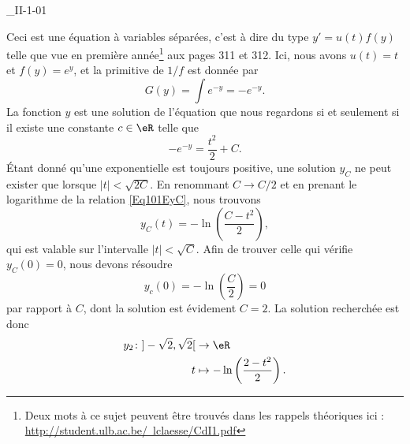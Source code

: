 

\begin{corrige}{_II-1-01}

Ceci est une équation à variables séparées, c'est à dire du type $y'=u(t)f(y)$ telle que vue en première année\footnote{Deux mots à ce sujet peuvent être trouvés dans les rappels théoriques ici :\\\href{http://student.ulb.ac.be/~lclaesse/CdI1.pdf}{http://student.ulb.ac.be/~lclaesse/CdI1.pdf}} aux pages 311 et 312. Ici, nous avons $u(t)=t$ et $f(y)= e^{y}$, et la primitive de $1/f$ est donnée par
\begin{equation}
	G(y)=\int e^{-y}=- e^{-y}.
\end{equation}
La fonction $y$ est une solution de l'équation que nous regardons si et seulement si il existe une constante $c\in\eR$ telle que
\begin{equation}		\label{Eq101EyC}
	- e^{-y}=\frac{ t^2 }{ 2 }+C.
\end{equation}
Étant donné qu'une exponentielle est toujours positive, une solution $y_C$ ne peut exister que lorsque $| t |<\sqrt{2C}$. En renommant $C\to C/2$ et en prenant le logarithme de la relation \eqref{Eq101EyC}, nous trouvons
\begin{equation}
	y_C(t)=-\ln\left( \frac{ C-t^2 }{ 2 } \right),
\end{equation}
qui est valable sur l'intervalle $| t |<\sqrt{C}$. Afin de trouver celle qui vérifie $y_C(0)=0$, nous devons résoudre
\begin{equation}
	y_c(0)=-\ln\left( \frac{ C }{ 2 } \right)=0
\end{equation}
par rapport à $C$, dont la solution est évidement $C=2$. La solution recherchée est donc
\begin{equation}
	\begin{aligned}
		y_2\colon ]-\sqrt{2},\sqrt{2}[&\to \eR \\
		t&\mapsto -\ln\left( \frac{ 2-t^2 }{2} \right).
	\end{aligned}
\end{equation}


\end{corrige}
